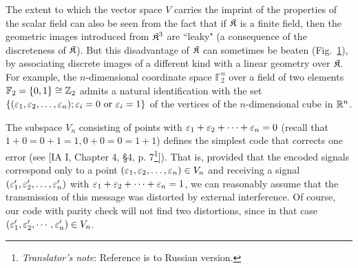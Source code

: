 The extent to which the vector space $V$ carries the imprint of the properties of the scalar field can also be seen from the fact that if ${\mathfrak{K}}$ is a finite field, then the geometric images introduced from ${\mathfrak{K}}^3$ are ``leaky" (a consequence of the discreteness of ${\mathfrak{K}}$). But this disadvantage of ${\mathfrak{K}}$ can sometimes be beaten (Fig.~\ref{fig:discrete-image}), by associating discrete images of a different kind with a linear geometry over ${\mathfrak{K}}$. For example, the $n$-dimensional coordinate space $\mathbb{F}_2^n$ over a field of two elements ${\mathbb{F}}_2 =\{0,1\}\cong{\mathbb{Z}}_2$ admits a natural identification with the set $\{(\varepsilon_1 ,\varepsilon_2 ,\dots ,\varepsilon_n ); \varepsilon_i =0 \text{ or } \varepsilon_i = 1\}$ of the vertices of the $n$-dimensional cube in ${\mathbb{R}}^n$.

\begin{figure}
	\label{fig:discrete-image}
	\caption{}
\end{figure}

The subspace $V_n$ consisting of points with $\varepsilon_1 +\varepsilon_2 + \dots + \varepsilon_n = 0$ (recall that $1 + 0 = 0 + 1 = 1, 0 + 0 = 0 = 1 + 1$) defines the simplest code that corrects one error (see [IA I, Chapter 4, \S4, p. 7\footnote{\textit{Translator's note}: Reference is to Russian version.}]). That is, provided that the encoded signals correspond only to a point $(\varepsilon_1 ,\varepsilon_2 ,\dots ,\varepsilon_n )\in V_n$ and receiving a signal $(\varepsilon_1 ',\varepsilon_2 ',\dots ,\varepsilon_n ')$ with $\varepsilon_1 +\varepsilon_2 + \dots + \varepsilon_n = 1$, we can reasonably assume that the transmission of this message was distorted by external interference. Of course, our code with parity check will not find two distortions, since in that case $(\varepsilon_1 ',\varepsilon_2 ',\cdots ,\varepsilon_n ') \in V_n$.